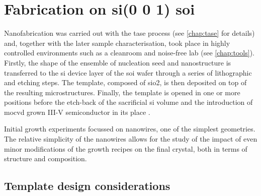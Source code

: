 \section{\texorpdfstring{Fabrication on \acs{si}\hkl(0 0 1) \acs{soi}}{Fabrication on Si(001) SOI}}
Nanofabrication was carried out with the \acs{tase} process (see \autoref{chap:tase} for details) and, together with the later sample characterisation, took place in highly controlled environments such as a cleanroom and noise-free lab (see \autoref{chap:tools}). Firstly, the shape of the ensemble of nucleation seed and nanostructure is transferred to the \acs{si} device layer of the \acs{soi} wafer through a series of lithographic and etching steps. The template, composed of \acs{sio2}, is then deposited on top of the resulting microstructures. Finally, the template is opened in one or more positions before the etch-back of the sacrificial \acs{si} volume and the introduction of \acf{mocvd} grown III-V semiconductor in its place \cite{Schmid2015, borgTASEp2018}.
\par
Initial growth experiments focussed on nanowires, one of the simplest geometries. The relative simplicity of the nanowires allows for the study of the impact of even minor modifications of the growth recipes on the final crystal, both in terms of structure and composition.

\subsection{Template design considerations}

